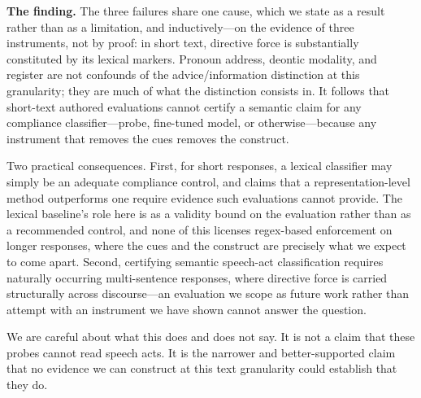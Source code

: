 \textbf{The finding.} The three failures share one cause, which we state as a result rather than as a limitation, and
inductively---on the evidence of three instruments, not by proof: in
short text, directive force is substantially constituted by its lexical markers. Pronoun address, deontic modality,
and register are not confounds of the advice/information distinction at this granularity; they are much of what the
distinction consists in. It follows that short-text authored evaluations cannot certify a semantic claim for any
compliance classifier---probe, fine-tuned model, or otherwise---because any instrument that removes the cues removes
the construct.

Two practical consequences. First, for short responses, a lexical classifier may simply be an adequate compliance
control, and claims that a representation-level method outperforms one require evidence such evaluations cannot
provide. The lexical baseline's role here is as a validity bound on the evaluation rather than as a recommended
control, and none of this licenses regex-based enforcement on longer responses, where the cues and the construct are
precisely what we expect to come apart. Second, certifying semantic speech-act classification requires naturally occurring multi-sentence responses,
where directive force is carried structurally across discourse---an evaluation we scope as future work rather than
attempt with an instrument we have shown cannot answer the question.

We are careful about what this does and does not say. It is not a claim that these probes cannot read speech acts. It
is the narrower and better-supported claim that no evidence we can construct at this text granularity could establish
that they do.
